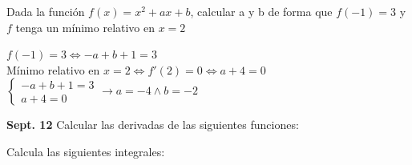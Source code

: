 \documentclass[addpoints,spanish, 12pt,a4paper]{exam}
\begin{document}
\begin{questions}
\begin{parts}
\end{parts}

\question[1]  Dada la función $f(x) = x^2 + ax + b$, calcular a y b de forma que $f(-1)=3$ y $f$ tenga un mínimo relativo en $x=2$

\begin{solution}
    $f(-1)=3 \Longleftrightarrow - a + b + 1 = 3$  \\
    Mínimo relativo en $x=2 \Longleftrightarrow f'(2)=0 \Longleftrightarrow a + 4 = 0$ \\
    $\begin{cases}
    - a + b + 1 = 3   \\
     a + 4 = 0
    \end{cases} \to a = -4 \land b=-2$
    
    
\end{solution}





\question \textbf{Sept. 12} Calcular las derivadas de las siguientes funciones: 

\question[4] Calcula las siguientes integrales:
\end{questions}
\end{document}
